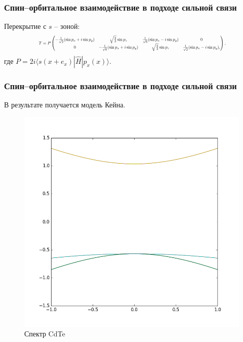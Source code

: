 \documentclass{beamer}
\begin{document}
\begin{frame}
    \frametitle{Спин--орбитальное взаимодействие в подходе сильной связи}
    Перекрытие с $s$ -- зоной:
    \begin{equation}
    \scalebox{0.6}{
    $
    T = P\begin{pmatrix}
            -\frac{1}{\sqrt{2}}(\sin{p_x} + i\sin{p_y}) & \sqrt{\frac{2}{3}}\sin{p_z} &
             \frac{1}{\sqrt{6}}(\sin{p_x} - i\sin{p_y}) & 0 \\  
            0 & -\frac{1}{\sqrt{6}}(\sin{p_x} + i\sin{p_y}) & 
            \sqrt{\frac{2}{3}}\sin{p_z} & \frac{1}{\sqrt{2}}(\sin{p_x} - i\sin{p_y}),
         \end{pmatrix},
    $}
    \end{equation}
    где $P = 2i\langle s(x+e_x) | \hat{H} | p_x(x)\rangle$.
\end{frame}
\begin{frame}
    \frametitle{Спин--орбитальное взаимодействие в подходе сильной связи}
    В результате получается модель Кейна.
    \begin{figure}
        \includegraphics[height=0.6\textheight]{cdte.png}
        \caption{Спектр CdTe}
    \end{figure}
\end{frame}
\end{document}
